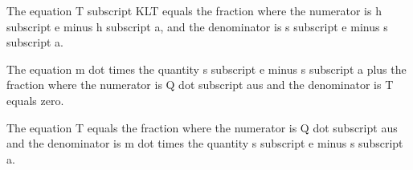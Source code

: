 The equation T subscript KLT equals the fraction where the numerator is h subscript e minus h subscript a, and the denominator is s subscript e minus s subscript a.

The equation m dot times the quantity s subscript e minus s subscript a plus the fraction where the numerator is Q dot subscript aus and the denominator is T equals zero.

The equation T equals the fraction where the numerator is Q dot subscript aus and the denominator is m dot times the quantity s subscript e minus s subscript a.